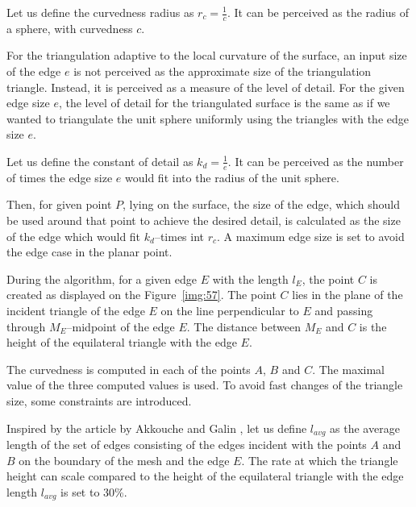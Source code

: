 Let us define the curvedness radius as $r_c = \frac{1}{c}$. It can be perceived as
the radius of a sphere, with curvedness $c$.

For the triangulation adaptive to the local curvature of the surface, an input
size of the edge $e$ is not perceived as the approximate size of the triangulation
triangle. Instead, it is perceived as a measure of the level of detail.
For the given edge size $e$, the level of detail for the triangulated surface
is the same as if we wanted to triangulate the unit sphere uniformly using
the triangles with the edge size $e$.

Let us define the constant of detail as $k_d = \frac{1}{e}$. It can be perceived
as the number of times the edge size $e$ would fit into the radius of the unit
sphere.

Then, for given point $P$, lying on the surface, the size of the edge, which
should be used around that point to achieve the desired detail, is 
calculated as the size of the edge which would fit $k_d$--times int $r_c$.
A maximum edge size is set to avoid the edge case in the planar point.

During the algorithm, for a given edge $E$ with the length $l_E$, the point
$C$ is created as displayed on the Figure~\ref{img:57}. The point $C$ lies
in the plane of the incident triangle of the edge $E$ on the line perpendicular
to $E$ and passing through $M_E$--midpoint of the edge $E$. The distance between
$M_E$ and $C$ is the height of the equilateral triangle with the edge $E$.

The curvedness is computed in each of the points $A$, $B$ and $C$.
The maximal value of the three computed values is used.
To avoid fast changes of the triangle size, some constraints are 
introduced. 

Inspired by the article by Akkouche and Galin \cite{akkouche2001adaptive},
let us define $l_{avg}$ as the average length of the set of edges consisting
of the edges incident with the points $A$ and $B$ on the boundary of the mesh
and the edge $E$.
The rate at which the triangle height can scale compared to
the height of the equilateral triangle with the edge length $l_{avg}$ is set to 30\%. 

